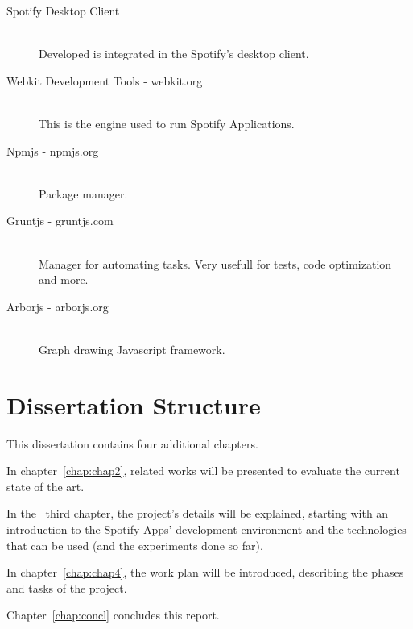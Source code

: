 \begin{description}
  \item[Spotify Desktop Client] \hfill \\
    Developed is integrated in the Spotify's desktop client.
  \item[Webkit Development Tools - webkit.org] \hfill \\
    This is the engine used to run Spotify Applications.
  \item[Npmjs - npmjs.org] \hfill \\
    Package manager.
  \item[Gruntjs - gruntjs.com] \hfill \\
    Manager for automating tasks. Very usefull for tests, code optimization and more.
  \item[Arborjs - arborjs.org] \hfill \\
    Graph drawing Javascript framework.
\end{description}


\section{Dissertation Structure} \label{sec:struct}

This dissertation contains four additional chapters.

In chapter~\ref{chap:chap2}, related works will be presented to evaluate the current state of the art.

In the ~\hyperref[chap:chap3]{third} chapter, the project's details will be explained, starting with an introduction to the Spotify Apps' development environment and the technologies that can be used (and the experiments done so far).

In chapter~\ref{chap:chap4}, the work plan will be introduced, describing the phases and tasks of the project.

Chapter~\ref{chap:concl} concludes this report.
